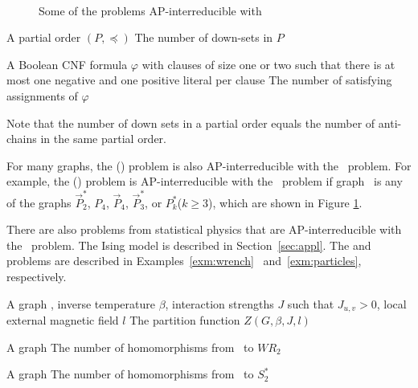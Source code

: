\begin{figure}[h]
\centering
\subfigure[\(\vec{P}^*_2\)]{\label{fig:ds}}\hfill 
\subfigure[\(P_4\)]{\label{fig:p4}}\hfill
\subfigure[Directed \(P_4\)] {\label{fig:dp4}}\\
\subfigure[\(\vec{P}^*_3\)]{\label{fig:dps3}}\hfill
\subfigure[\(P^*_k\)]{\label{fig:psk}}
\caption{Some of the problems AP-interreducible with \cbis}
\label{fig:bisred}
\end{figure} 

\pdef{\cds}
{A partial order \((P,\preceq)\)}
{The number of down-sets in \(P\)}

{A Boolean CNF formula \(\varphi\) with clauses of size one or two such that
there is at most one negative and one positive literal per clause}
{The number of satisfying assignments of \(\varphi\)}

Note that the number of down sets in a partial order equals
the number of anti-chains in the same partial order. 

For many graphs, the \chom(\mH) problem is also AP-interreducible with the \cbis\ problem.
For example, the \chom(\mH) problem is AP-interreducible with the \cbis\ problem
if graph \mH\ is any of the graphs \(\vec{P}^*_2\), \(P_4\), \(\vec{P}_4\), \(\vec{P}^*_3\),
or \(P^*_k\)(\(k\ge 3\)), which are shown in Figure \ref{fig:bisred}\@.
 
There are also problems from statistical physics that are AP-interreducible with the \cbis\
problem. The Ising model is described in Section~\ref{sec:appl}.
The \pname{\#2-Wrench-Coloring}
and  problems are described in Examples~\ref{exm:wrench}~
and~\ref{exm:particles}, respectively.

{A graph \mG, inverse temperature \(\beta\), interaction strengths \(J\) such that
\(J_{u,v} > 0\), local external magnetic field \(l\)}
{The partition function \(Z(G,\beta,J,l)\)}

{A graph \mG}
{The number of homomorphisms from \mG\ to \(WR_2\)}

{A graph \mG}
{The number of homomorphisms from \mG\ to \(S^*_2\)}


